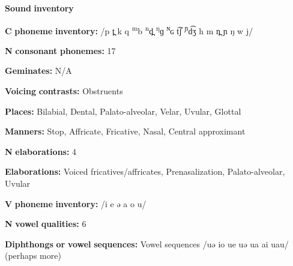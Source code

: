\documentclass[output=paper]{langsci/langscibook}
\begin{document}
\begin{styleBody}
\textbf{Sound} \textbf{inventory}
\end{styleBody}

\begin{styleBody}
\textbf{C} \textbf{phoneme} \textbf{inventory:} /p t̪ k q \textsuperscript{m}b \textsuperscript{n}d̪ \textsuperscript{ŋ}ɡ \textsuperscript{ɴ}ɢ t͡ʃ \textsuperscript{ɲ}d͡ʒ h m n̪ ɲ ŋ w j/
\end{styleBody}

\begin{styleBody}
\textbf{N} \textbf{consonant} \textbf{phonemes:} 17
\end{styleBody}

\begin{styleBody}
\textbf{Geminates:} N/A
\end{styleBody}

\begin{styleBody}
\textbf{Voicing} \textbf{contrasts:} Obstruents
\end{styleBody}

\begin{styleBody}
\textbf{Places:} Bilabial, Dental, Palato-alveolar, Velar, Uvular, Glottal
\end{styleBody}

\begin{styleBody}
\textbf{Manners:} Stop, Affricate, Fricative, Nasal, Central approximant
\end{styleBody}

\begin{styleBody}
\textbf{N} \textbf{elaborations:} 4
\end{styleBody}

\begin{styleBody}
\textbf{Elaborations:} Voiced fricatives/affricates, Prenasalization, Palato-alveolar, Uvular
\end{styleBody}

\begin{styleBody}
\textbf{V} \textbf{phoneme} \textbf{inventory:} /i e ə a o u/
\end{styleBody}

\begin{styleBody}
\textbf{N} \textbf{vowel} \textbf{qualities:} 6
\end{styleBody}

\begin{styleBody}
\textbf{Diphthongs} \textbf{or} \textbf{vowel} \textbf{sequences:} Vowel sequences /uə io ue uə ua ai uau/ (perhaps more)
\end{styleBody}
\end{document}
